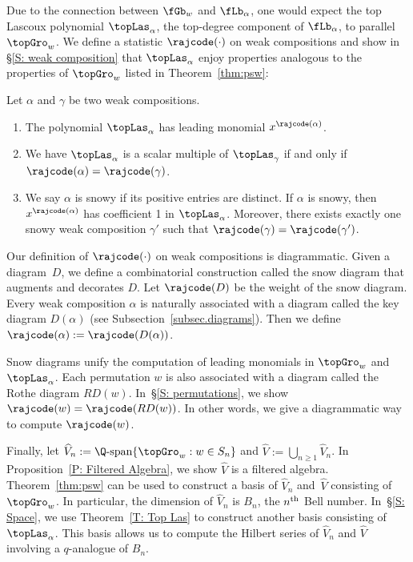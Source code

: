 Due to the connection between $\fGb_w$ and $\fLb_\alpha$, one would expect the top Lascoux polynomial $\topLas_\alpha$, the top-degree component of $\fLb_\alpha$, to parallel $\topGro_w$. 
We define a statistic $\rajcode(\cdot)$ on weak compositions and show in \S\ref{S: weak composition} that $\topLas_\alpha$ enjoy properties analogous to the properties of $\topGro_w$ listed in Theorem~\ref{thm:psw}:


\begin{ourthm}
\label{T: Top Las}
Let $\alpha$ and $\gamma$ be two weak compositions. 
\begin{enumerate}
\item[(a)]
The polynomial $\topLas_\alpha$ has leading monomial $x^{\rajcode(\alpha)}$.
\item[(b)] We have
$\topLas_\alpha$ is a scalar multiple of $\topLas_{\gamma}$
if and only if $\rajcode(\alpha) = \rajcode(\gamma)$.
\item[(c)] 
We say $\alpha$ is snowy if its
positive entries are distinct.
If $\alpha$ is snowy, then $x^{\rajcode(\alpha)}$ has coefficient 1 in $\topLas_\alpha$.
Moreover, 
there exists exactly one snowy weak composition $\gamma'$ 
such that $\rajcode(\gamma) = \rajcode(\gamma')$.
\end{enumerate}     
\end{ourthm}

Our definition of $\rajcode(\cdot)$
on weak compositions is diagrammatic. 
Given a diagram~$D$, 
we define a combinatorial
construction called the snow diagram 
that augments and decorates $D$.
Let $\rajcode(D)$
be the weight of the snow diagram.
Every weak composition $\alpha$ is naturally
associated with a diagram called
the key diagram $D(\alpha)$
(see Subsection~\ref{subsec.diagrams}).
Then we define $\rajcode(\alpha):=\rajcode(D(\alpha))$.

Snow diagrams unify the computation of leading monomials in $\topGro_w$ and $\topLas_\alpha$.
Each permutation $w$ is also associated
with a diagram called the Rothe diagram
$RD(w)$.
In~\S\ref{S: permutations},
we show $\rajcode(w) = \rajcode(RD(w))$.
In other words, we give a diagrammatic way to compute $\rajcode(w)$.

Finally, let $\widehat{V}_n :=  \Q\textrm{-span}\{\topGro_w: w \in S_n\}$ and $\widehat{V} :=  
\bigcup_{n \geq 1} \widehat{V}_n$.
In Proposition~\ref{P: Filtered Algebra},
we show $\widehat{V}$
is a filtered algebra. 
Theorem~\ref{thm:psw} can be used to construct a basis of $\widehat{V}_n$
and~$\widehat{V}$ 
consisting of $\topGro_w$.
In particular, 
the dimension of $\widehat{V}_n$
is $B_n$, the $n\textsuperscript{th}$ Bell number.
In~\S\ref{S: Space},
we use Theorem~\ref{T: Top Las} to construct another basis consisting of $\topLas_\alpha$.
This basis allows us to compute the Hilbert series of $\widehat{V}_n$ 
and $\widehat{V}$
involving a $q$-analogue of $B_n$.

